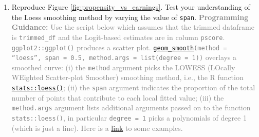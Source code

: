 \documentclass[
]{article}
\providecommand{\tightlist}{%
  \setlength{\itemsep}{0pt}\setlength{\parskip}{0pt}}
\begin{document}
\begin{enumerate}
\def\labelenumi{\alph{enumi}.}
\tightlist
\item
  Reproduce Figure \ref{fig:propensity_vs_earnings}. Test your
  understanding of the Loess smoothing method by varying the value of
  \texttt{span}.
  \textcolor{gray}{\textbf{Programming Guidance:} Use the script below which assumes that the trimmed dataframe is \texttt{trimmed\_df} and the Logit-based estimates are in column \texttt{pscore}. \texttt{ggplot2::ggplot()} produces a scatter plot. \href{https://ggplot2.tidyverse.org/reference/geom_smooth.html}{\texttt{geom\_smooth}}\texttt{(method = ``loess'', span = 0.5, method.args = list(degree = 1))} overlays a smoothed curve: (i) the \texttt{method} argument picks the LOWESS (LOcally WEighted Scatter-plot Smoother) smoothing method, i.e., the R function \href{https://www.rdocumentation.org/packages/stats/versions/3.6.2/topics/loess}{\texttt{stats::loess()}}; (ii) the \texttt{span} argument indicates the proportion of the total number of points that contribute to each local fitted value; (iii) the \texttt{method.args} argument lists additional arguments passed on to the function \texttt{stats::loess()}, in particular \texttt{degree = 1} picks a polynomials of degree 1 (which is just a line). Here is a \href{https://ggplot2.tidyverse.org/reference/geom_smooth.html}{link} to some examples.}
\end{enumerate}
\end{document}
